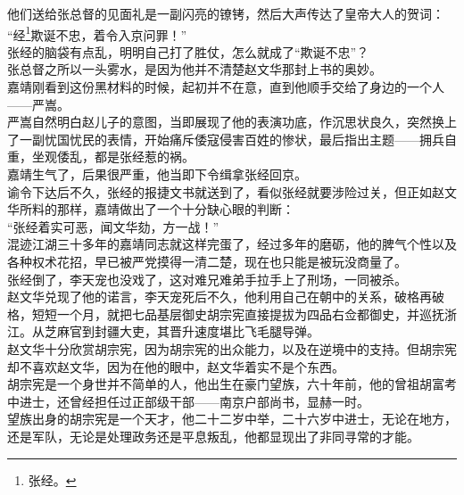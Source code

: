 \begin{multicols}{\theparacolNo}
他们送给张总督的见面礼是一副闪亮的镣铐，然后大声传达了皇帝大人的贺词：\\

“经\footnote{张经。}欺诞不忠，着令入京问罪！”\\

张经的脑袋有点乱，明明自己打了胜仗，怎么就成了“欺诞不忠”？\\

张总督之所以一头雾水，是因为他并不清楚赵文华那封上书的奥妙。\\

嘉靖刚看到这份黑材料的时候，起初并不在意，直到他顺手交给了身边的一个人——严嵩。\\

严嵩自然明白赵儿子的意图，当即展现了他的表演功底，作沉思状良久，突然换上了一副忧国忧民的表情，开始痛斥倭寇侵害百姓的惨状，最后指出主题——拥兵自重，坐观倭乱，都是张经惹的祸。\\

嘉靖生气了，后果很严重，他当即下令缉拿张经回京。\\

谕令下达后不久，张经的报捷文书就送到了，看似张经就要涉险过关，但正如赵文华所料的那样，嘉靖做出了一个十分缺心眼的判断：\\

“张经着实可恶，闻文华劾，方一战！”\\

混迹江湖三十多年的嘉靖同志就这样完蛋了，经过多年的磨砺，他的脾气个性以及各种权术花招，早已被严党摸得一清二楚，现在也只能是被玩没商量了。\\

张经倒了，李天宠也没戏了，这对难兄难弟手拉手上了刑场，一同被杀。\\

赵文华兑现了他的诺言，李天宠死后不久，他利用自己在朝中的关系，破格再破格，短短一个月，就把七品基层御史胡宗宪直接提拔为四品右佥都御史，并巡抚浙江。从芝麻官到封疆大吏，其晋升速度堪比飞毛腿导弹。\\

赵文华十分欣赏胡宗宪，因为胡宗宪的出众能力，以及在逆境中的支持。但胡宗宪却不喜欢赵文华，因为在他的眼中，赵文华着实不是个东西。\\

胡宗宪是一个身世并不简单的人，他出生在豪门望族，六十年前，他的曾祖胡富考中进士，还曾经担任过正部级干部——南京户部尚书，显赫一时。\\

望族出身的胡宗宪是一个天才，他二十二岁中举，二十六岁中进士，无论在地方，还是军队，无论是处理政务还是平息叛乱，他都显现出了非同寻常的才能。\\


\end{multicols}
